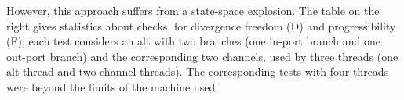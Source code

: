 \begin{window}
%
However, this approach suffers from a state-space explosion.  The table on the
right gives statistics about checks, for divergence freedom (D) and
progressibility (F); each test considers an alt with two branches (one in-port
branch and one out-port branch) and the corresponding two channels, used by
three threads (one alt-thread and two channel-threads).  The corresponding
tests with four threads were beyond the limits of the machine used. 
\end{window}
